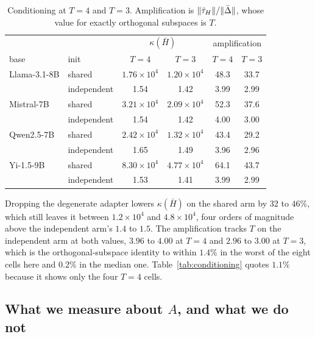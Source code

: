 \begin{table}[tb]
\centering
\small
\caption{Conditioning at $T=4$ and $T=3$. Amplification is
$\|\bar{\tau}_H\|/\|\bar\Delta\|$, whose value for exactly orthogonal subspaces
is $T$.}
\label{tab:conditioning-t3}
\begin{tabular}{llcccc}
\toprule
 & & \multicolumn{2}{c}{$\kappa(\bar H)$} &
\multicolumn{2}{c}{amplification} \\
base & init & $T{=}4$ & $T{=}3$ & $T{=}4$ & $T{=}3$ \\
\midrule
Llama-3.1-8B & shared      & $1.76\times10^{4}$ & $1.20\times10^{4}$ & 48.3 & 33.7 \\
             & independent & 1.54 & 1.42 & 3.99 & 2.99 \\
\addlinespace
Mistral-7B   & shared      & $3.21\times10^{4}$ & $2.09\times10^{4}$ & 52.3 & 37.6 \\
             & independent & 1.54 & 1.42 & 4.00 & 3.00 \\
\addlinespace
Qwen2.5-7B   & shared      & $2.42\times10^{4}$ & $1.32\times10^{4}$ & 43.4 & 29.2 \\
             & independent & 1.65 & 1.49 & 3.96 & 2.96 \\
\addlinespace
Yi-1.5-9B    & shared      & $8.30\times10^{4}$ & $4.77\times10^{4}$ & 64.1 & 43.7 \\
             & independent & 1.53 & 1.41 & 3.99 & 2.99 \\
\bottomrule
\end{tabular}
\end{table}

Dropping the degenerate adapter lowers $\kappa(\bar H)$ on the shared arm
by $32$ to $46\%$, which still leaves it between $1.2\times10^{4}$ and
$4.8\times10^{4}$, four orders of magnitude above the independent arm's
$1.4$ to $1.5$. The amplification tracks $T$ on the independent arm at
both values, $3.96$ to $4.00$ at $T=4$ and $2.96$ to $3.00$ at $T=3$,
which is the orthogonal-subspace identity to within $1.4\%$ in the worst of
the eight cells here and $0.2\%$ in the median one. Table~\ref{tab:conditioning}
quotes $1.1\%$ because it shows only the four $T=4$ cells.

\subsection{What we measure about \texorpdfstring{$A$}{A}, and what we do
not}
\label{subsec:drift}

